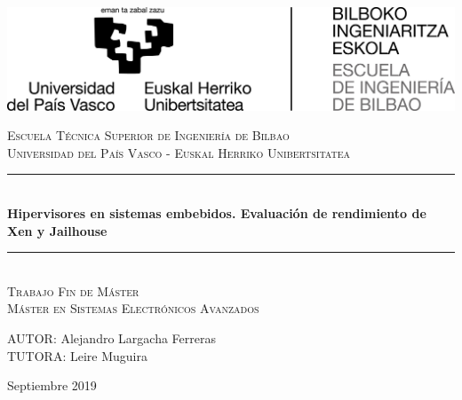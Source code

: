 \begin{titlepage}

\newcommand{\HRule}{\rule{\linewidth}{0.5mm}} %

\center %

\begin{flushright}
\includegraphics[scale=0.35]{recursos/Escuela_Ingenieria_Bizkaia_bilingue_positivo_alta.jpg}
\\[3cm]
\end{flushright}

\textsc{\Large Escuela Técnica Superior de Ingeniería de Bilbao}\\[0.5cm]
\textsc{\large Universidad del País Vasco - Euskal Herriko Unibertsitatea}
\\[2cm]


 \HRule \\[0.4cm]
{ \huge \bfseries Hipervisores en sistemas embebidos. Evaluación de rendimiento de Xen y Jailhouse }\\[0.4cm] %
\HRule \\[2.0cm]

\textsc{\LARGE Trabajo Fin de Máster}\\[0.5cm]
\textsc{\Large Máster en Sistemas Electrónicos Avanzados }\\[2.0cm]

\begin{flushright}
\large
AUTOR: Alejandro Largacha Ferreras\\ %
TUTORA: Leire Muguira %
\end{flushright}

\vspace{1.1cm}

{ { Septiembre 2019}}\\[3cm] %

\vfill %

\end{titlepage}

